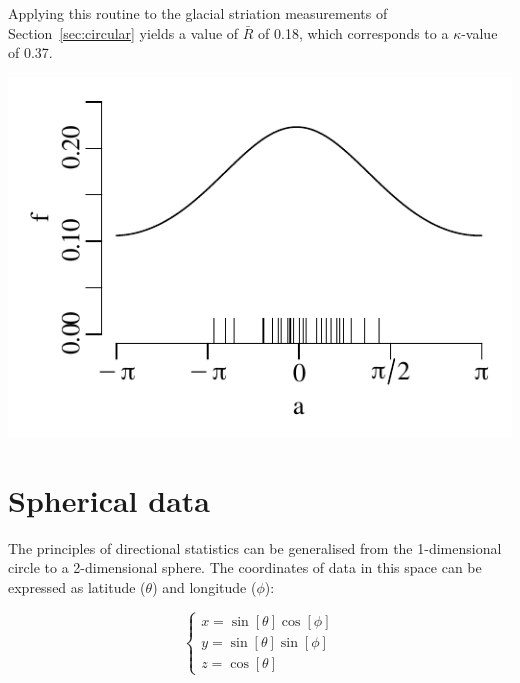 Applying this routine to the glacial striation measurements of
Section~\ref{sec:circular} yields a value of $\bar{R}$ of 0.18, which
corresponds to a $\kappa$-value of 0.37.

\noindent\begin{minipage}[t][][b]{.4\textwidth}
\includegraphics[width=\textwidth]{../figures/kappastriations.pdf}\\
\end{minipage}
\begin{minipage}[t][][t]{.6\textwidth}
  \label{fig:kappastriations}
\end{minipage}

\section{Spherical data}
\label{sec:spherical-data}

The principles of directional statistics can be generalised from the
1-dimensional circle to a 2-dimensional sphere. The coordinates of
data in this space can be expressed as latitude ($\theta$) and
longitude ($\phi$):

\begin{equation}
  \left\{
  \begin{array}{l}
    x = \sin[\theta] \cos[\phi]\\
    y = \sin[\theta] \sin[\phi]\\
    z = \cos[\theta]
  \end{array}
  \right.
\end{equation}

